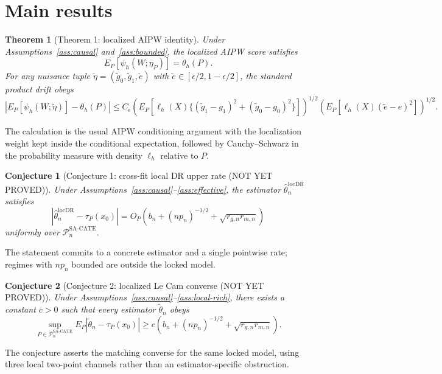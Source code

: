 \documentclass[11pt]{article}
\theoremstyle{definition}
\theoremstyle{plain}
\newtheorem{theorem}{Theorem}
\newtheorem{conjecture}{Conjecture}
\theoremstyle{remark}
\begin{document}
\section{Main results}
\begin{theorem}[Theorem 1: localized AIPW identity]\label{thm:localized-aipw}
Under Assumptions~\ref{ass:causal} and~\ref{ass:bounded}, the localized AIPW score satisfies
\[
  E_P[\psi_h(W;\eta_P)]=\theta_h(P).
\]
For any nuisance tuple $\tilde\eta=(\tilde g_0,\tilde g_1,\tilde e)$ with $\tilde e\in[\epsilon/2,1-\epsilon/2]$, the standard product drift obeys
\[
  \left|E_P[\psi_h(W;\tilde\eta)]-\theta_h(P)\right|
  \le C_\epsilon
  \left(E_P[\ell_h(X)\{(\tilde g_1-g_1)^2+(\tilde g_0-g_0)^2\}]\right)^{1/2}
  \left(E_P[\ell_h(X)(\tilde e-e)^2]\right)^{1/2}.
\]
\end{theorem}
The calculation is the usual AIPW conditioning argument with the localization weight kept inside the conditional expectation, followed by Cauchy--Schwarz in the probability measure with density $\ell_h$ relative to $P$.

\begin{conjecture}[Conjecture 1: cross-fit local DR upper rate (NOT YET PROVED)]\label{conj:upper}
Under Assumptions~\ref{ass:causal}--\ref{ass:effective}, the estimator $\hat\theta_n^{\mathrm{locDR}}$ satisfies
\[
  \left|\hat\theta_n^{\mathrm{locDR}}-\tau_P(x_0)\right|
  =O_P\!\left(b_n+(n p_n)^{-1/2}+\sqrt{r_{g,n}r_{m,n}}\right)
\]
uniformly over $\mathcal{P}_n^{\mathrm{SA\text{-}CATE}}$.
\end{conjecture}
The statement commits to a concrete estimator and a single pointwise rate; regimes with $n p_n$ bounded are outside the locked model.

\begin{conjecture}[Conjecture 2: localized Le Cam converse (NOT YET PROVED)]\label{conj:lower}
Under Assumptions~\ref{ass:causal}--\ref{ass:local-rich}, there exists a constant $c>0$ such that every estimator $\tilde\theta_n$ obeys
\[
  \sup_{P\in\mathcal{P}_n^{\mathrm{SA\text{-}CATE}}}
  E_P\left|\tilde\theta_n-\tau_P(x_0)\right|
  \ge c\left(b_n+(n p_n)^{-1/2}+\sqrt{r_{g,n}r_{m,n}}\right).
\]
\end{conjecture}
The conjecture asserts the matching converse for the same locked model, using three local two-point channels rather than an estimator-specific obstruction.
\end{document}
